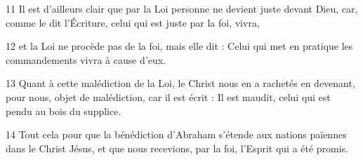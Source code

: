 
11 Il est d’ailleurs clair que par la Loi personne ne devient juste devant Dieu, car, comme le dit l’Écriture, celui qui est juste par la foi, vivra,

12 et la Loi ne procède pas de la foi, mais elle dit : Celui qui met en pratique les commandements vivra à cause d’eux.

13 Quant à cette malédiction de la Loi, le Christ nous en a rachetés en devenant, pour nous, objet de malédiction, car il est écrit : Il est maudit, celui qui est pendu au bois du supplice.

14 Tout cela pour que la bénédiction d’Abraham s’étende aux nations païennes dans le Christ Jésus, et que nous recevions, par la foi, l’Esprit qui a été promis.